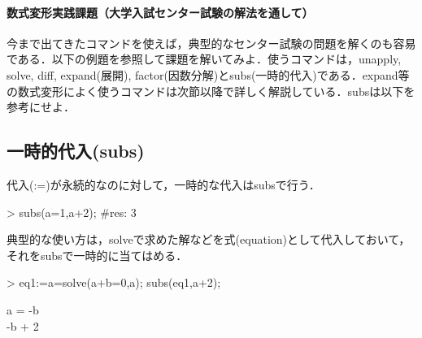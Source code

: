 \paragraph{数式変形実践課題（大学入試センター試験の解法を通して）}
今まで出てきたコマンドを使えば，典型的なセンター試験の問題を解くのも容易である．以下の例題を参照して課題を解いてみよ．使うコマンドは，unapply, solve, diff, expand(展開), factor(因数分解)とsubs(一時的代入)である．expand等の数式変形によく使うコマンドは次節以降で詳しく解説している．subsは以下を参考にせよ．

\subsection{一時的代入(subs)}
代入(:=)が永続的なのに対して，一時的な代入はsubsで行う．
\begin{MapleInput}
> subs(a=1,a+2); #res: 3
\end{MapleInput}
典型的な使い方は，solveで求めた解などを式(equation)として代入しておいて，それをsubsで一時的に当てはめる．
\begin{MapleInput}
> eq1:=a=solve(a+b=0,a); subs(eq1,a+2);
\end{MapleInput}
\begin{MapleOutputGather}
a = -b \notag \\
-b + 2 \notag
\end{MapleOutputGather}


